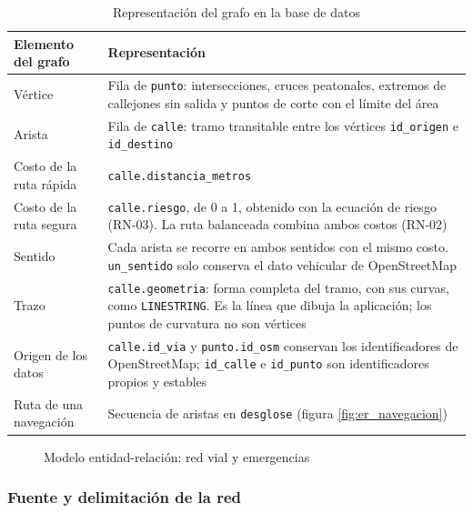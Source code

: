 \begin{table}[htbp]
\centering
\caption{Representación del grafo en la base de datos}
\label{tab:grafo_bd}
\begin{tabular}{|>{\raggedright\arraybackslash}p{}|>{\raggedright\arraybackslash}p{}|}
\hline
\textbf{Elemento del grafo} & \textbf{Representación} \\ \hline
Vértice & Fila de \texttt{punto}: intersecciones, cruces peatonales, extremos de callejones sin salida y puntos de corte con el límite del área \\ \hline
Arista & Fila de \texttt{calle}: tramo transitable entre los vértices \texttt{id\_origen} e \texttt{id\_destino} \\ \hline
Costo de la ruta rápida & \texttt{calle.distancia\_metros} \\ \hline
Costo de la ruta segura & \texttt{calle.riesgo}, de 0 a 1, obtenido con la ecuación de riesgo (RN-03). La ruta balanceada combina ambos costos (RN-02) \\ \hline
Sentido & Cada arista se recorre en ambos sentidos con el mismo costo. \texttt{un\_sentido} solo conserva el dato vehicular de OpenStreetMap \\ \hline
Trazo & \texttt{calle.geometria}: forma completa del tramo, con sus curvas, como \texttt{LINESTRING}. Es la línea que dibuja la aplicación; los puntos de curvatura no son vértices \\ \hline
Origen de los datos & \texttt{calle.id\_via} y \texttt{punto.id\_osm} conservan los identificadores de OpenStreetMap; \texttt{id\_calle} e \texttt{id\_punto} son identificadores propios y estables \\ \hline
Ruta de una navegación & Secuencia de aristas en \texttt{desglose} (figura \ref{fig:er_navegacion}) \\ \hline
\end{tabular}
\end{table}

\begin{figure}[htbp]
    \centering
    
    \caption{Modelo entidad-relación: red vial y emergencias}
    \label{fig:er_red_vial}
\end{figure}

\subsubsection{Fuente y delimitación de la red}

